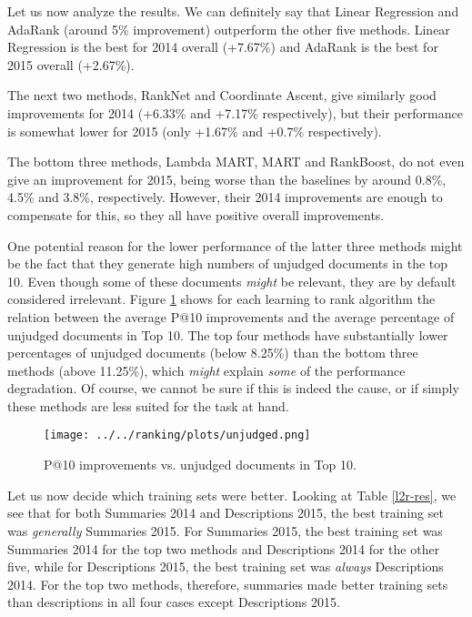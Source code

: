 Let us now analyze the results. We can definitely say that Linear Regression and AdaRank (around 5\% improvement)
outperform the other five methods. Linear Regression is the best for 2014 overall (+7.67\%) and 
AdaRank is the best for 2015 overall (+2.67\%).

The next two methods, RankNet and Coordinate Ascent, give similarly good
improvements for 2014 (+6.33\% and +7.17\% respectively), but their performance is somewhat lower
for 2015 (only +1.67\% and +0.7\% respectively).

The bottom three methods, Lambda MART, MART and RankBoost, do not even give an improvement for 2015, being worse
than the baselines by around 0.8\%, 4.5\% and 3.8\%, respectively. However, their 2014 improvements are enough to compensate
for this, so they all have positive overall improvements.

One potential reason for the lower performance of the latter three methods might be the fact that they generate high
numbers of unjudged documents in the top 10. Even though some of these documents \emph{might} be relevant,
they are by default considered irrelevant.
Figure \ref{unjudged-fig} shows for each learning to rank algorithm
the relation between the average P@10 improvements and the average 
percentage of unjudged documents in Top 10. The top four methods
have substantially lower percentages of unjudged documents (below 8.25\%) than the bottom
three methods (above 11.25\%), which \emph{might} explain \emph{some} of the performance degradation.
Of course, we cannot
be sure if this is indeed the cause, or if simply these methods are less suited for the task at hand.

\begin{figure}[h!]
\centerline{
  \texttt{[image: ../../ranking/plots/unjudged.png]}
  }
  \caption{P@10 improvements vs. unjudged documents in Top 10.}
  \label{unjudged-fig}
\end{figure}

Let us now decide which training sets were better.
Looking at Table \ref{l2r-res}, we see that for both Summaries 2014 and Descriptions 2015, the best
training set was \emph{generally} Summaries 2015. 
For Summaries 2015, the best training set 
was Summaries 2014 for the top two methods and Descriptions 2014 for the other five,
while for Descriptions 2015, the best training set was \emph{always} Descriptions 2014.
For the top two methods, therefore, summaries made better training sets than descriptions in all
four cases except Descriptions 2015.

